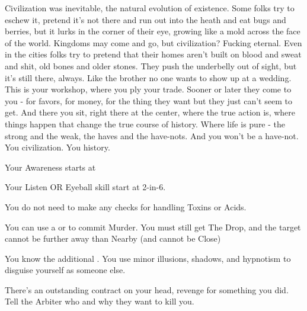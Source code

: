 {  Civilization was inevitable, the natural evolution of existence.  Some folks try to eschew it, pretend it's not there and run out into the heath and eat bugs and berries, but it lurks in the corner of their eye, growing like a mold across the face of the world.  Kingdoms may come and go, but civilization?  Fucking eternal.  Even in the cities folks try to pretend that their homes aren't built on blood and sweat and shit, old bones and older stones.  They push the underbelly out of sight, but it's still there, always.  Like the brother no one wants to show up at a wedding.  This is your workshop, where you ply your trade.  Sooner or later they come to you - for favors, for money, for the thing they want but they just can't seem to get.  And there you sit, right there at the center, where the true action is, where things happen that change the true course of history.  Where life is pure - the strong and the weak, the haves and the have-nots. And you won't be a have-not.  You   civilization.  You   history.



  Your Awareness starts at \DCUP

  Your Listen OR Eyeball skill start at 2-in-6. 


  You do not need to make any checks for handling Toxins or Acids.

  You can use a  or  to commit Murder. You must still get The Drop, and the target cannot be further away than Nearby (and cannot be Close)

  You know the additional .  You use minor illusions, shadows, and hypnotism to disguise yourself as someone else.

  There's an outstanding contract on your head, revenge for something you did.  Tell the Arbiter who and why they want to kill you.

}
